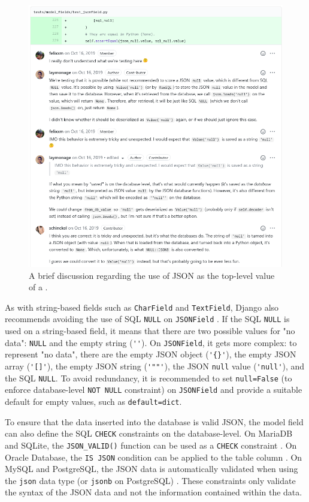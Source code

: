 \begin{figure}
	\centering
    \includegraphics[width=1.0\textwidth]{pics/null_discussion.png}
	\caption{A brief discussion regarding the use of JSON  as the
	top-level value of a .}
	\label{fig:nulldiscussion}
\end{figure}

As with string-based fields such as \verb|CharField| and \verb|TextField|,
Django also recommends avoiding the use of SQL \verb|NULL| on \verb|JSONField|
\cite{django:model_fields}. If the SQL \verb|NULL| is used on a string-based
field, it means that there are two possible values for "no data": \verb|NULL|
and the empty string (\verb|''|). On \verb|JSONField|, it gets more complex:
to represent "no data", there are the empty JSON object (\verb|'{}'|), the
empty JSON array (\verb|'[]'|), the empty JSON string (\verb|'""'|), the JSON
\verb|null| value (\verb|'null'|), and the SQL \verb|NULL|. To avoid
redundancy, it is recommended to set \verb|null=False| (to enforce
database-level \verb|NOT NULL| constraint) on \verb|JSONField| and provide
a suitable default for empty values, such as \verb|default=dict|.

To ensure that the data inserted into the database is valid JSON, the model
field can also define the SQL \verb|CHECK| constraints on the database-level.
On MariaDB and SQLite, the \verb|JSON_VALID()| function can be used as a
\verb|CHECK| constraint \cite{mariadb:json_valid, sqlite:json1}. On Oracle
Database, the \verb|IS JSON| condition can be applied to the table column
\cite{oracle:is_json}. On MySQL and PostgreSQL, the JSON data is automatically
validated when using the \verb|json| data type (or \verb|jsonb| on PostgreSQL)
\cite{postgres:json, mysql:json}. These constraints only validate the syntax of
the JSON data and not the information contained within the data.

